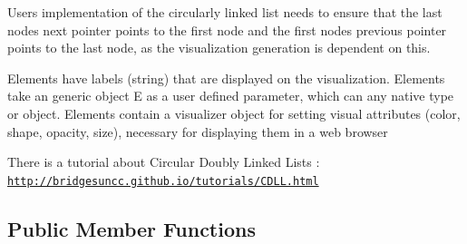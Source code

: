 User\textquotesingle{}s implementation of the circularly linked list needs to ensure that the last node\textquotesingle{}s next pointer points to the first node and the first node\textquotesingle{}s previous pointer points to the last node, as the visualization generation is dependent on this.

Elements have labels (string) that are displayed on the visualization. Elements take an generic object E as a user defined parameter, which can any native type or object. Elements contain a visualizer object for setting visual attributes (color, shape, opacity, size), necessary for displaying them in a web browser

There is a tutorial about Circular Doubly Linked Lists \+: \href{http://bridgesuncc.github.io/tutorials/CDLL.html}{\tt http\+://bridgesuncc.\+github.\+io/tutorials/\+C\+D\+L\+L.\+html} \subsection*{Public Member Functions}
